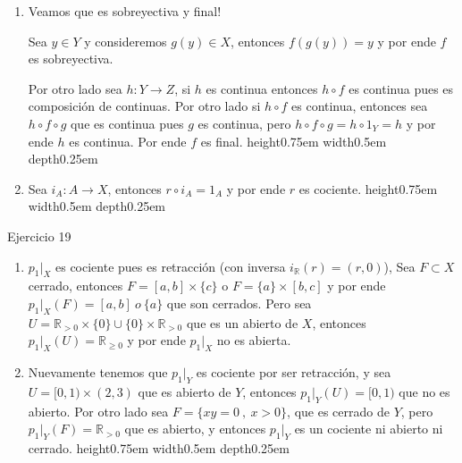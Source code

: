 \documentclass[11pt]{article}
\newcommand{\R}{{\mathbb{R}}}
\newcommand{\sett}[1]{\{#1\}}
\newcommand{\sette}[2]{\{#1 \ , \ #2 \}}
\newenvironment{proof}[1][Demostraci\'on]{\begin{trivlist}
\item[\hskip \labelsep {\bfseries #1}]}{\end{trivlist}}
\newcommand{\qed}{\nobreak \ifvmode \relax \else
      \ifdim\lastskip<1.5em \hskip-\lastskip
      \hskip1.5em plus0em minus0.5em \fi \nobreak
      \vrule height0.75em width0.5em depth0.25em\fi}
\begin{document}
\begin{enumerate}
\begin{proof}

\begin{enumerate}

\item Veamos que es sobreyectiva y final!

Sea $y \in Y$ y consideremos $g(y) \in X$, entonces $f(g(y)) = y$ y por ende $f$ es sobreyectiva.

Por otro lado sea $h : Y \rightarrow Z$, si $h$ es continua entonces $h \circ f$ es continua pues es composici\'on de continuas. Por otro lado si $h \circ f$ es continua, entonces sea $h \circ f \circ g$ que es continua pues $g$ es continua, pero $h \circ f \circ g = h \circ 1_Y =  h$ y por ende $h$ es continua. Por ende $f$ es final. \qed

\item Sea $i_A : A \rightarrow X$, entonces $r \circ i_A = 1_A$ y por ende $r$ es cociente. \qed

\end{enumerate}

\end{proof}

\item {Ejercicio 19}

\begin{proof}

\begin{enumerate}

\item $p_{1}|_{X}$ es cociente pues es retracci\'on (con inversa $i_{\R} (r) = (r,0)$), Sea $F \subset X$ cerrado, entonces $F = [a,b] \times \sett{c}$ o $F = \sett{a} \times [b,c]$ y por ende $p_{1}|_{X}(F) = [a,b] \ o \ \sett{a}$ que son cerrados. Pero sea $U = \R_{> 0} \times \sett{0} \cup \sett{0} \times \R_{> 0}$ que es un abierto de $X$, entonces $p_{1}|_{X}(U) = \R_{\geq 0}$ y por ende $p_{1}|_{X}$ no es abierta.

\item Nuevamente tenemos que $p_{1}|_{Y}$ es cociente por ser retracci\'on, y sea $U = [0,1) \times (2,3)$ que es abierto de $Y$, entonces $p_{1}|_{Y}(U) = [0,1)$ que no es abierto. Por otro lado sea $F = \sette{xy = 0}{x > 0}$, que es cerrado de $Y$, pero $p_{1}|_{Y}(F) = \R_{> 0}$ que es abierto, y entonces $p_{1}|_{Y}$ es un cociente ni abierto ni cerrado. \qed

\end{enumerate}

\end{proof}


\end{enumerate}
\end{document}
